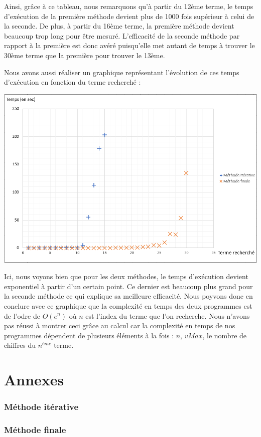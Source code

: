 \documentclass{article}
\newcommand{\code}[3]{}
\begin{document}
Ainsi, grâce à ce tableau, nous remarquons qu'à partir du 12ème terme, le temps d'exécution de la première méthode devient plus de 1000 fois supérieur à celui de la seconde. De plus, à partir du 16ème terme, la première méthode devient beaucoup trop long pour être mesuré. L'efficacité de la seconde méthode par rapport à la première est donc avéré puisqu'elle met autant de temps à trouver le 30ème terme que la première pour trouver le 13ème.

Nous avons aussi réaliser un graphique représentant l'évolution de ces temps d'exécution en fonction du terme recherché :

\bigbreak
\begin{center}
\includegraphics[scale = 0.5]{Graphe.png}
\end{center}
\bigbreak

Ici, nous voyons bien que pour les deux méthodes, le temps d'exécution devient exponentiel à partir d'un certain point. Ce dernier est beaucoup plus grand pour la seconde méthode ce qui explique sa meilleure efficacité. Nous poyvons donc en conclure avec ce graphique que la complexité en temps des deux programmes est de l'odre de $O(e^{n})$ où $n$ est l'index du terme que l'on recherche. Nous n'avons pas réussi à montrer ceci grâce au calcul car la complexité en temps de nos programmes dépendent de plusieurs éléments à la fois : $n$, $vMax$, le nombre de chiffres du $n^{ème}$ terme.

\newpage
\part{Annexes}
\section*{Méthode itérative}
\code{1}{38}{Problem119_1.py}

\newpage
\section*{Méthode finale}
\code{1}{41}{Problem119_2.py}
\end{document}
